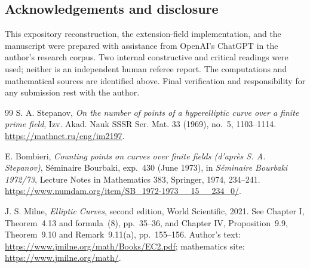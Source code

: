 \documentclass[11pt]{amsart}
\theoremstyle{definition}
\theoremstyle{remark}
\begin{document}
\subsection*{Acknowledgements and disclosure}
This expository reconstruction, the extension-field implementation, and the manuscript were prepared with assistance from OpenAI's ChatGPT in the author's research corpus. Two internal constructive and critical readings were used; neither is an independent human referee report. The computations and mathematical sources are identified above. Final verification and responsibility for any submission rest with the author.

\begin{thebibliography}{99}
S. A. Stepanov, \emph{On the number of points of a hyperelliptic curve over a finite prime field},
Izv. Akad. Nauk SSSR Ser. Mat. 33 (1969), no.~5, 1103--1114.
\url{https://mathnet.ru/eng/im2197}.

E. Bombieri, \emph{Counting points on curves over finite fields (d'apr\`es S. A. Stepanov)},
S\'eminaire Bourbaki, exp.~430 (June 1973), in \emph{S\'eminaire Bourbaki 1972/73},
Lecture Notes in Mathematics 383, Springer, 1974, 234--241.
\url{https://www.numdam.org/item/SB_1972-1973__15__234_0/}.

J. S. Milne, \emph{Elliptic Curves}, second edition, World Scientific, 2021.
See Chapter I, Theorem~4.13 and formula~(8), pp.~35--36, and Chapter IV,
Proposition~9.9, Theorem~9.10 and Remark~9.11(a), pp.~155--156.
Author's text: \url{https://www.jmilne.org/math/Books/EC2.pdf};
mathematics site: \url{https://www.jmilne.org/math/}.
\end{thebibliography}
\end{document}

